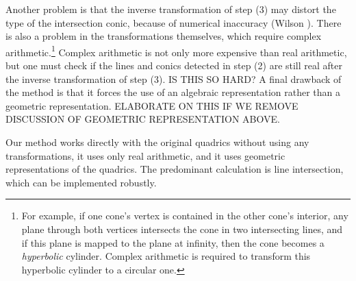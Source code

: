 \begin{remark}
Another problem is that the inverse transformation of step (3) 
may distort the type of the intersection
conic, because of numerical inaccuracy (Wilson \cite{wilson:1987}).
There is also a problem in the transformations themselves,
which require complex arithmetic.\footnote{For example, 
	if one cone's vertex is contained in the other cone's
	interior, any plane through both vertices intersects the cone
	in two intersecting lines, and if this plane is mapped to the plane
	at infinity, then the cone becomes a {\em hyperbolic} cylinder.
	Complex arithmetic is required to transform this hyperbolic cylinder
	to a circular one.}
Complex arithmetic is not only more expensive than real arithmetic,
but one must check if the lines and conics detected in step (2) 
are still real after the inverse transformation of step (3).
IS THIS SO HARD?
A final drawback of the method is that it forces the use of an algebraic
representation rather than a geometric representation.
ELABORATE ON THIS IF WE REMOVE DISCUSSION OF GEOMETRIC REPRESENTATION ABOVE.

Our method works directly with the original quadrics without using
any transformations, it uses only real arithmetic, and it uses geometric
representations of the quadrics.
The predominant calculation is line intersection, which can be implemented
robustly.
\end{remark}


